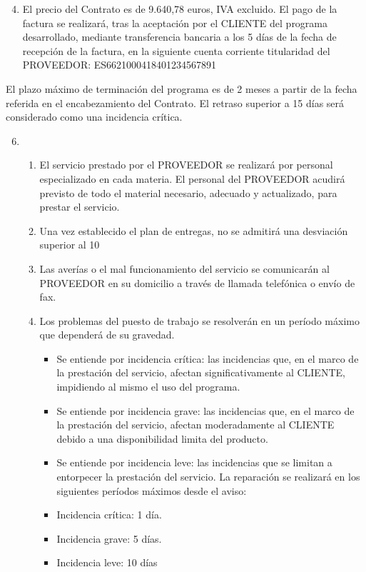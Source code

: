 \begin{description}[style=nextline]
\item[CUARTA.- PRECIO Y FACTURACIÓN]
\newline
\begin{enumerate}
  \setcounter{enumi}{3}
  \item El precio del Contrato es de 9.640,78 euros, IVA excluido.
  El pago de la factura se realizará, tras la aceptación por el CLIENTE del programa desarrollado, mediante transferencia bancaria a los 5 días de la fecha de recepción de la factura, en la siguiente cuenta corriente titularidad del PROVEEDOR: ES6621000418401234567891
\end{enumerate}
\item[QUINTA.- DURACIÓN DEL CONTRATO]
\par El plazo máximo de terminación del programa es de 2 meses a partir de la fecha referida en el encabezamiento del Contrato.
El retraso superior a 15 días será considerado como una incidencia crítica.

\item[SEXTA.- ACUERDO DE NIVEL DE SERVICIO]
\newline
\begin{enumerate}
  \setcounter{enumi}{5}
  \item
  \begin{enumerate}
    \item	El servicio prestado por el PROVEEDOR se realizará por personal especializado en cada materia. El personal del PROVEEDOR acudirá previsto de todo el material necesario, adecuado y actualizado, para prestar el servicio.
    \item	Una vez establecido el plan de entregas, no se admitirá una desviación superior al 10%
    \item	Las averías o el mal funcionamiento del servicio se comunicarán al PROVEEDOR en su domicilio a través de llamada telefónica o envío de fax.
    \item	Los problemas del puesto de trabajo se resolverán en un período máximo que dependerá de su gravedad.
    \begin{itemize}[-]
      \item	Se entiende por incidencia crítica: las incidencias que, en el marco de la prestación del servicio, afectan significativamente al CLIENTE, impidiendo al mismo el uso del programa.
      \item	Se entiende por incidencia grave: las incidencias que, en el marco de la prestación del servicio, afectan moderadamente al CLIENTE debido a una disponibilidad limita del producto.
      \item	Se entiende por incidencia leve: las incidencias que se limitan a entorpecer la prestación del servicio.
      La reparación se realizará en los siguientes períodos máximos  desde el aviso:
      \item	Incidencia crítica: 1 día.
      \item	Incidencia grave: 5 días.
      \item	Incidencia leve: 10 días
    \end{itemize}
  \end{enumerate}
\end{enumerate}


\end{description}
